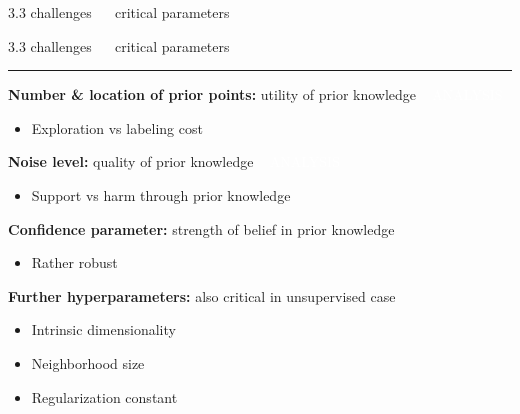 \documentclass[11pt, compress, t, notes = noshow, xcolor = table, 
aspectratio = 1610]{beamer}
\newcommand{\maketag}[1]{\colorbox{highlightcol}{\textcolor{white}
{\MakeUppercase{#1}}}}
\newcommand{\highlight}[1]{\textcolor{highlightcol}{\textbf{#1}}}
\newcommand{\arritem}{\item[\highlight{$\rightarrow$}]}
\newcommand{\flexitem}[1]{\item[$\highlight{#1}$]}
\begin{document}
\begin{frame}{\textcolor{gray!90}{3.3 challenges} ~~ critical parameters}
% 
% 

\end{frame}


\LARGE
\begin{frame}{\textcolor{gray!90}{3.3 challenges} ~~ critical parameters}
\normalsize
\vspace{-0.5cm}
\noindent \textcolor{gray!90}{\rule{\textwidth}{1pt}}
\smallskip


\textbf{Number \& location of prior points:} utility of prior knowledge ~ 
\maketag{analysis}

\begin{itemize}
  \arritem Exploration vs labeling cost
\end{itemize}

\textbf{Noise level:} quality of prior knowledge ~ 
\maketag{analysis}

\begin{itemize}
  \arritem Support vs harm through prior knowledge
\end{itemize}

\textbf{Confidence parameter:} strength of belief in prior knowledge 

\begin{itemize}
  \arritem Rather robust
\end{itemize}

% 

\vspace{0.3cm}

\textbf{Further hyperparameters:} also critical in unsupervised case

\begin{itemize}
  \flexitem{1} Intrinsic dimensionality
  \flexitem{2} Neighborhood size
  \flexitem{3} Regularization constant
\end{itemize}
% 
% 
% 
% 
% 



\end{frame}
\end{document}
